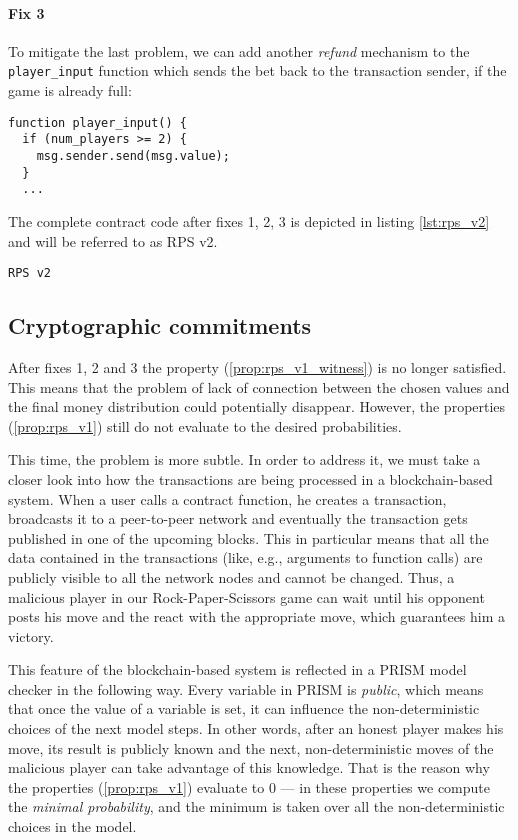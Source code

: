 \paragraph{Fix 3}

To mitigate the last problem, we can add another \emph{refund} mechanism to the \lstinline{player_input} function
which sends the bet back to the transaction sender, if the game is already full:
\begin{lstlisting}
function player_input() {
  if (num_players >= 2) {
    msg.sender.send(msg.value);
  }
  ...
\end{lstlisting}

The complete contract code after fixes 1, 2, 3 is depicted in listing \ref{lst:rps_v2} and will be referred to as RPS v2.

%
\begin{lstlisting}[caption=RPS v2, label=lst:rps_v2]
RPS v2
\end{lstlisting}

\subsection{Cryptographic commitments}

After fixes 1, 2 and 3 the property (\ref{prop:rps_v1_witness}) is no longer satisfied.
This means that the problem of lack of connection between the chosen values and the final money distribution
could potentially disappear.
However, the properties (\ref{prop:rps_v1}) still do not evaluate to the desired probabilities.

This time, the problem is more subtle.
In order to address it, we must take a closer look into how the transactions are being processed
in a blockchain-based system.
When a user calls a contract function, he creates a transaction, broadcasts it to a peer-to-peer network and 
eventually the transaction gets published in one of the upcoming blocks.
This in particular means that all the data contained in the transactions (like, e.g., arguments to function calls)
are publicly visible to all the network nodes and cannot be changed.
Thus, a malicious player in our Rock-Paper-Scissors game can wait until his opponent posts his move and 
the react with the appropriate move, which guarantees him a victory.

This feature of the blockchain-based system is reflected in a PRISM model checker in the following way.
Every variable in PRISM is \emph{public}, which means that once the value of a variable is set, it can influence
the non-deterministic choices of the next model steps.
In other words, after an honest player makes his move, its result is publicly known and the next, non-deterministic
moves of the malicious player can take advantage of this knowledge.
That is the reason why the properties (\ref{prop:rps_v1}) evaluate to 0 --- in these properties we compute the
\emph{minimal probability}, and the minimum is taken over all the non-deterministic choices in the model.

